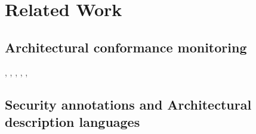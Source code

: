 \section{Related Work}

\subsection{Architectural conformance monitoring}
\cite{aldrich_archjava_2002}, \cite{abi-antoun_analyzing_2010}, \cite{luckham_event-based_1995}, \cite{abi-antoun_static_2009}, \cite{de_silva_controlling_2012}, \cite{knodel_comparison_2007} 



\subsection{Security annotations and Architectural description languages}
\cite{sabo_preserving_2009}




